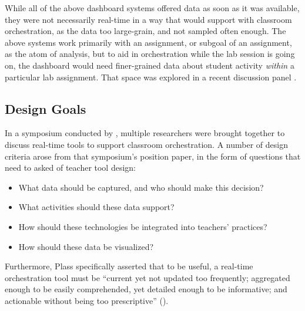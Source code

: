 While all of the above dashboard systems offered data as soon as it was available, they were not necessarily real-time in a way that would support with classroom orchestration, as the data too large-grain, and not sampled often enough. The above systems work primarily with an assignment, or subgoal of an assignment, as the atom of analysis, but to aid in orchestration while the lab session is going on, the dashboard would need finer-grained data about student activity \emph{within} a particular lab assignment. That space was explored in a recent discussion panel \citep{dillenbourgreal}.


\subsection{Design Goals}
In a symposium conducted by \cite{dillenbourgreal}, multiple researchers were brought together to discuss real-time tools to support classroom orchestration. A number of design criteria arose from that symposium's position paper, in the form of questions that need to asked of teacher tool design:
\begin{itemize}
\item What data should be captured, and who should make this decision?
\item What activities should these data support?
\item How should these technologies be integrated into teachers' practices?
\item How should these data be visualized?
\end{itemize}

Furthermore, Plass specifically asserted that to be useful, a real-time orchestration tool must be ``current yet not updated too frequently; aggregated enough to be easily comprehended, yet detailed enough to be informative; and actionable without being too prescriptive'' (\citeyear{dillenbourgreal}).




